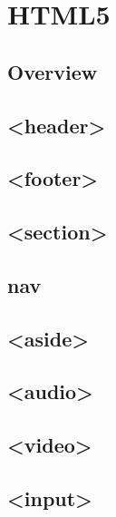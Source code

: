 \part{HTML5}

\chapter{Overview}


\chapter{<header>}


\chapter{<footer>}


\chapter{<section>}


\chapter{nav}

\chapter{<aside>}


\chapter{<audio>}


\chapter{<video>}

\chapter{<input>}





\begin{lstlisting}[language=HTML]

\end{lstlisting}




\begin{lstlisting}[language=HTML]

\end{lstlisting}





